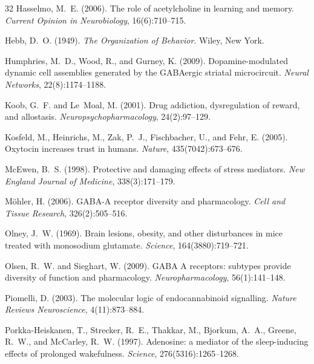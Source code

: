 \documentclass[11pt,a4paper]{article}
\begin{document}
\begin{thebibliography}{32}
Hasselmo, M.~E. (2006).
\newblock The role of acetylcholine in learning and memory.
\newblock \emph{Current Opinion in Neurobiology}, 16(6):710--715.

Hebb, D.~O. (1949).
\newblock \emph{The Organization of Behavior}.
\newblock Wiley, New York.

Humphries, M.~D., Wood, R., and Gurney, K. (2009).
\newblock Dopamine-modulated dynamic cell assemblies generated by the GABAergic striatal microcircuit.
\newblock \emph{Neural Networks}, 22(8):1174--1188.

Koob, G.~F. and Le~Moal, M. (2001).
\newblock Drug addiction, dysregulation of reward, and allostasis.
\newblock \emph{Neuropsychopharmacology}, 24(2):97--129.

Kosfeld, M., Heinrichs, M., Zak, P.~J., Fischbacher, U., and Fehr, E. (2005).
\newblock Oxytocin increases trust in humans.
\newblock \emph{Nature}, 435(7042):673--676.

McEwen, B.~S. (1998).
\newblock Protective and damaging effects of stress mediators.
\newblock \emph{New England Journal of Medicine}, 338(3):171--179.

M{\"o}hler, H. (2006).
\newblock GABA-A receptor diversity and pharmacology.
\newblock \emph{Cell and Tissue Research}, 326(2):505--516.

Olney, J.~W. (1969).
\newblock Brain lesions, obesity, and other disturbances in mice treated with monosodium glutamate.
\newblock \emph{Science}, 164(3880):719--721.

Olsen, R.~W. and Sieghart, W. (2009).
\newblock GABA A receptors: subtypes provide diversity of function and pharmacology.
\newblock \emph{Neuropharmacology}, 56(1):141--148.

Piomelli, D. (2003).
\newblock The molecular logic of endocannabinoid signalling.
\newblock \emph{Nature Reviews Neuroscience}, 4(11):873--884.

Porkka-Heiskanen, T., Strecker, R.~E., Thakkar, M., Bjorkum, A.~A., Greene, R.~W., and McCarley, R.~W. (1997).
\newblock Adenosine: a mediator of the sleep-inducing effects of prolonged wakefulness.
\newblock \emph{Science}, 276(5316):1265--1268.


\end{thebibliography}
\end{document}
